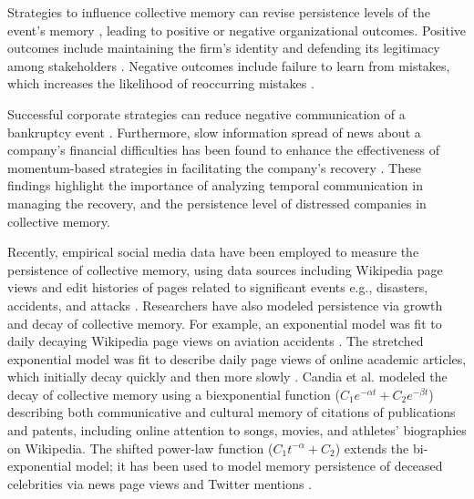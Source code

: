 \documentclass[9pt,twocolumn,twoside,lineno]{pnas-new}
\begin{document}
Strategies to influence collective memory can revise persistence levels of the event's memory \cite{mena2016forgetting}, leading to positive or negative organizational outcomes.
Positive outcomes include maintaining the firm's identity and defending its legitimacy among stakeholders \cite{anteby2012collective}.
Negative outcomes include failure to learn from mistakes, which increases the likelihood of reoccurring mistakes \cite{easterby2011praise}.

Successful corporate strategies can reduce negative communication of a bankruptcy event \cite{setiowati2022public}.
Furthermore, slow information spread of news about a company's financial difficulties has been found to enhance the effectiveness of momentum-based strategies in facilitating the company's recovery \cite{hong2000bad, doukas2005european}. 
These findings highlight the importance of analyzing temporal communication in managing the recovery, and the persistence level of distressed companies in collective memory.


Recently, empirical social media data have been employed to measure the persistence of collective memory, using data sources including Wikipedia page views and edit histories of pages related to significant events e.g., disasters, accidents, and attacks \cite{garcia2017memory,mestyan2013early,yasseri2016wikipedia}.
Researchers have also modeled persistence via growth and decay of collective memory.
For example, an exponential model was fit to daily decaying Wikipedia page views on aviation accidents \cite{garcia2016dynamics}.
The stretched exponential model was fit to describe daily page views of online academic articles, which initially decay quickly and then more slowly \cite{kim2021stretched}.
Candia et al. \cite{candia2019universal} modeled the decay of collective memory using a biexponential function ($C_1e^{-\alpha t}+C_2e^{-\beta t}$) describing both communicative and cultural memory of citations of publications and patents, including online attention to songs, movies, and athletes' biographies on Wikipedia.
The shifted power-law function ($C_1t^{-\alpha} + C_2$) extends the bi-exponential model; it has been used to model memory persistence of deceased celebrities via news page views and Twitter mentions \cite{west2021postmortem}.
\end{document}
